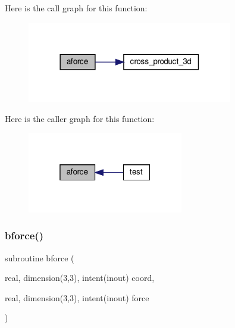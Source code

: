 Here is the call graph for this function\+:
\nopagebreak
\begin{figure}[H]
\begin{center}
\leavevmode
\includegraphics[width=254pt]{water__optimize_8f90_a860a9ce2ec48bea8e9cd249437c3269d_cgraph}
\end{center}
\end{figure}
Here is the caller graph for this function\+:
\nopagebreak
\begin{figure}[H]
\begin{center}
\leavevmode
\includegraphics[width=193pt]{water__optimize_8f90_a860a9ce2ec48bea8e9cd249437c3269d_icgraph}
\end{center}
\end{figure}
\mbox{\label{water__optimize_8f90_a1c61ecd9ef781071e23a3290f6371c4d}} 
\subsubsection{\texorpdfstring{bforce()}{bforce()}}
{\footnotesize\ttfamily subroutine bforce (\begin{DoxyParamCaption}\item[{real, dimension(3,3), intent(inout)}]{coord,  }\item[{real, dimension(3,3), intent(inout)}]{force }\end{DoxyParamCaption})}

